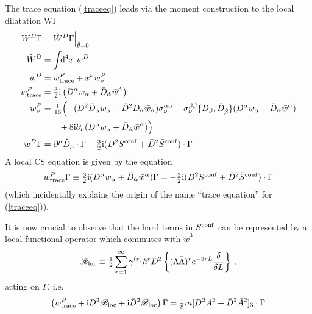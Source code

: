 \documentclass[a4paper,12pt]{article}
\newcommand{\Bl}{{\mathscr B}_{\rm loc}}
\newcommand{\Blb}{\bar {\mathscr B}_{\rm loc}}
\newcommand{\e}{{\rm e}}
\newcommand{\I}{{\rm i}}
\def\pr{\partial}
\newcommand{\half}{{\textstyle \frac{1}{2}}}
\newcommand{\dx}{\!\!{\rm d}^4x\,\,}
\newcommand{\al}{\alpha}
\newcommand{\da}{{\dot\alpha}}
\newcommand{\be}{\beta}
\newcommand{\db}{{\dot\beta}}
\newcommand{\tfr}[2]{{\textstyle \frac{#1}{#2}}}
\newcommand{\fdq}[2]{\frac{\delta #1}{\delta #2}}
\begin{document}
The trace equation (\ref{traceeq}) leads via the moment construction to the
local dilatation WI
\begin{align}
W^D \Gamma &= \hat W^D \Gamma \Bigr|_{\tilde \theta=0}\\
\hat W^D &= \int \dx w^D\\
w^D &= w^P_{\rm trace} + x^\nu w_\nu^P\\
w^P_{\rm trace} &= \tfr{3}{2} \I \left( D^\al w_\al + \bar D_\da \bar w^\da
\right) \\
w^P_\nu &= \tfr{1}{16} \Bigl( - ( D^2 \bar D_\da w_\al + \bar D^2 D_\al
  \bar w_\da) \sigma_\nu^{\al\da} 
- \sigma_\nu^{\be\db} \{ D_\be, \bar D_\db \} (D^\al w_\al - \bar D_\da
\bar w^\da)\nonumber \\
& \qquad  + 8\I \pr_\nu (D^\al w_\al + \bar D_\da \bar w^\da) \Bigr) \\
w^D \Gamma &= \pr^\mu \hat D_\mu \cdot \Gamma -\tfr{3}{2} \I (D^2 S^{\rm
  conf} + \bar D^2 \bar S^{\rm conf}) \cdot \Gamma
\end{align}
A local CS equation is given by the equation
\begin{align}
w_{\rm trace}^P \Gamma \equiv \tfr{3}{2}\I(D^\al w_\al + \bar D_\da \bar
w^\da) \Gamma = -\tfr{3}{2} \I (D^2 S^{\rm conf} + \bar D^2 \bar S^{\rm
  conf}) \cdot \Gamma
\end{align}
(which incidentally explains the origin of the name ``trace equation'' for (\ref{traceeq})).

It is now crucial to observe that the hard terms in $S^{\rm conf}$ can be
represented by a local functional operator which commutes with $\tilde w^3$
\begin{equation}
\Bl \equiv \half \sum_{r=1}^\infty \gamma^{(r)} \hbar^r \bar D^2 \left\{
  (\Lambda \bar   \Lambda)^r \e^{-3rL} \fdq{}{L} \right\}\,,
\end{equation}
acting on $\Gamma$, i.e.\
\begin{equation}
\left( w_{\rm trace}^P + \I D^2 \Bl+ \I \bar D^2 \Blb \right) \Gamma =
\tfr{\I}{8} m [D^2 A^2 + \bar D^2 \bar A^2]_3 \cdot
\Gamma \label{CSlocal}
\end{equation}
\end{document}
